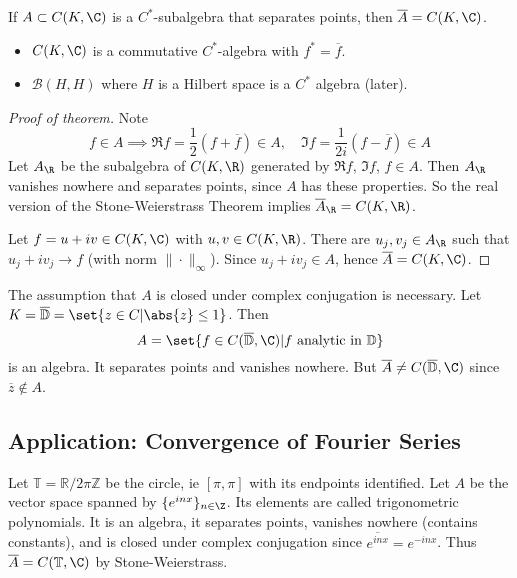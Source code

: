 \documentclass{article}
\begin{document}
\begin{cor}
    If $A \subset C(K, \C)$ is a $C^*$-subalgebra that separates points, then $\overline{A} = C(K, \C)$.
\end{cor}

\begin{eg}
    \leavevmode
    \begin{itemize}
        \item $C(K, \C)$ is a commutative $C^*$-algebra with $f^* = \overline{f}$.
        \item $\mathcal{B}(H, H)$ where $H$ is a Hilbert space is a $C^*$ algebra (later).
    \end{itemize}
\end{eg}

\begin{proof}[Proof of theorem]
    Note
    \begin{equation*}
        f \in A \implies \Re f = \frac{1}{2} (f + \overline{f}) \in A, \quad \Im f = \frac{1}{2i}(f - \overline{f}) \in A
    \end{equation*}
    Let $A_\R$ be the subalgebra of $C(K, \R)$ generated by $\Re f$, $\Im f$, $f \in A$.
    Then $A_\R$ vanishes nowhere and separates points, since $A$ has these properties.
    So the real version of the Stone-Weierstrass Theorem implies $\overline{A}_\R = C(K, \R)$.

    Let $f = u + i v \in C(K, \C)$ with $u, v \in C(K, \R)$. There are $u_j, v_j \in A_\R$ such that $u_j + i v_j \to f$ (with norm $\|\cdot\|_\infty$).
    Since $u_j + i v_j \in A$, hence $\overline{A} = C(K, \C)$.
\end{proof}

\begin{eg}
    The assumption that $A$ is closed under complex conjugation is necessary.
    Let $K = \overline{\mathbb{D}} = \set{z \in C | \abs{z} \leq 1}$.
    Then
    \begin{equation*}
        A = \set{f \in C(\overline{\mathbb{D}}, \C) | f \text{ analytic in } \mathbb{D}}
    \end{equation*}
    is an algebra.
    It separates points and vanishes nowhere. But $\overline{A} \neq C(\overline{\mathbb{D}}, \C)$ since $\overline{z} \notin A$.
\end{eg}

\subsection{Application: Convergence of Fourier Series}
Let $\mathbb{T} = \mathbb{R}/2\pi\mathbb{Z}$ be the circle, ie $[\pi, \pi]$ with its endpoints identified.
Let $A$ be the vector space spanned by $\{e^{i n x}\}_{n \in \Z}$.
Its elements are called trigonometric polynomials.
It is an algebra, it separates points, vanishes nowhere (contains constants), and is closed under complex conjugation since $\overline{e^{i n x}} = e^{-i n x}$.
Thus $\overline{A} = C(\mathbb{T}, \C)$ by Stone-Weierstrass.
\end{document}
